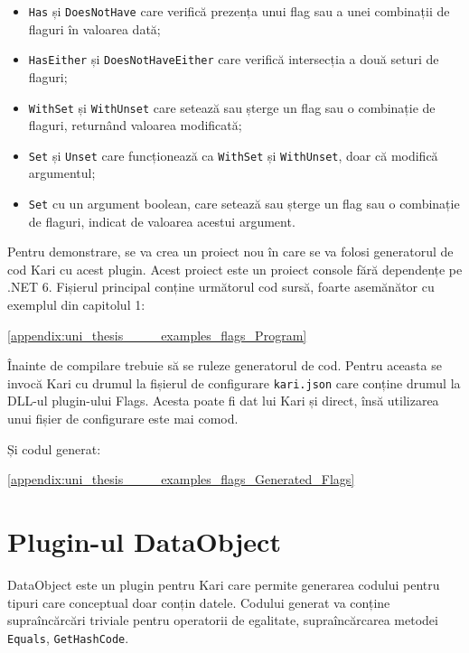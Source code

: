 \documentclass[a4paper,12pt]{report}
\begin{document}
\begin{itemize}
  \item \texttt{Has} și \texttt{DoesNotHave} care verifică prezența unui flag sau a unei combinații de flaguri în valoarea dată;
  \item \texttt{HasEither} și \texttt{DoesNotHaveEither} care verifică intersecția a două seturi de flaguri;
  \item \texttt{WithSet} și \texttt{WithUnset} care setează sau șterge un flag sau o combinație de flaguri, returnând valoarea modificată;
  \item \texttt{Set} și \texttt{Unset} care funcționează ca \texttt{WithSet} și \texttt{WithUnset}, doar că modifică argumentul;
  \item \texttt{Set} cu un argument boolean, care setează sau șterge un flag sau o combinație de flaguri, indicat de valoarea acestui argument.
\end{itemize}

Pentru demonstrare, se va crea un proiect nou în care se va folosi generatorul de cod Kari cu acest plugin.
Acest proiect este un proiect console fără dependențe pe .NET 6.
Fișierul principal conține următorul cod sursă, foarte asemănător cu exemplul din capitolul 1:

\ref{appendix:uni_thesis____examples_flags_Program}


Înainte de compilare trebuie să se ruleze generatorul de cod.
Pentru aceasta se invocă Kari cu drumul la fișierul de configurare \texttt{kari.json} care conține drumul la DLL-ul plugin-ului Flags.
Acesta poate fi dat lui Kari și direct, însă utilizarea unui fișier de configurare este mai comod.






Și codul generat:



\ref{appendix:uni_thesis____examples_flags_Generated_Flags}

\section{Plugin-ul DataObject}

DataObject este un plugin pentru Kari care permite generarea codului pentru tipuri care conceptual doar conțin datele.
Codului generat va conține supraîncărcări triviale pentru operatorii de egalitate, supraîncărcarea metodei \texttt{Equals}, \texttt{GetHashCode}.
\end{document}
